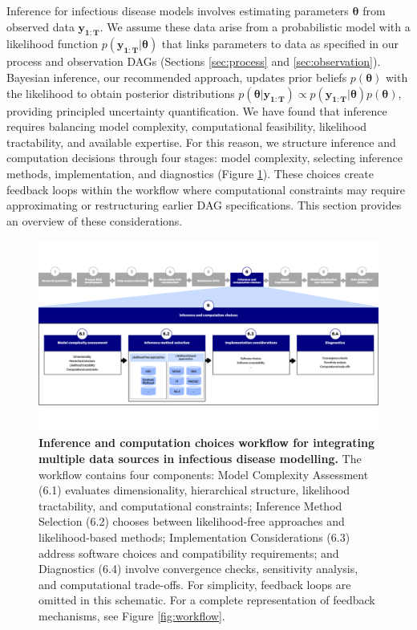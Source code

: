 \documentclass{article}
\begin{document}
Inference for infectious disease models involves estimating parameters $\boldsymbol{\theta}$ from observed data $\boldsymbol{y_{1:T}}$.
We assume these data arise from a probabilistic model with a likelihood function $p(\boldsymbol{y_{1:T}} |
  \boldsymbol{\theta})$ that links parameters to data as specified in our process and observation \ac{DAG}s (Sections \ref{sec:process} and \ref{sec:observation}).
Bayesian inference, our recommended approach, updates prior beliefs $p(\boldsymbol{\theta})$ with the likelihood to obtain posterior distributions $p(\boldsymbol{\theta} | \boldsymbol{y_{1:T}}) \propto p(\boldsymbol{y_{1:T}}|\boldsymbol{\theta}) p(\boldsymbol{\theta})$, providing principled uncertainty quantification.
We have found that inference requires balancing model complexity, computational feasibility, likelihood tractability, and available expertise.
For this reason, we structure inference and computation decisions through four stages: model complexity, selecting inference methods, implementation, and diagnostics (Figure \ref{fig:fitting}). 
These choices create feedback loops within the workflow where computational constraints may require approximating or restructuring earlier \ac{DAG} specifications.
This section provides an overview of these considerations.

\begin{figure}[htbp]
    \centering
    \includegraphics[width=\textwidth]{figures/Abbott et al figure 3.png}
    \caption{\textbf{Inference and computation choices workflow for integrating multiple data sources in infectious disease modelling.} The workflow contains four components: Model Complexity Assessment (6.1) evaluates dimensionality, hierarchical structure, likelihood tractability, and computational constraints; Inference Method Selection (6.2) chooses between likelihood-free approaches and likelihood-based methods; Implementation Considerations (6.3) address software choices and compatibility requirements; and Diagnostics (6.4) involve convergence checks, sensitivity analysis, and computational trade-offs. For simplicity, feedback loops are omitted in this schematic. For a complete representation of feedback mechanisms, see Figure \ref{fig:workflow}.}
    \label{fig:fitting}
\end{figure}
\end{document}
